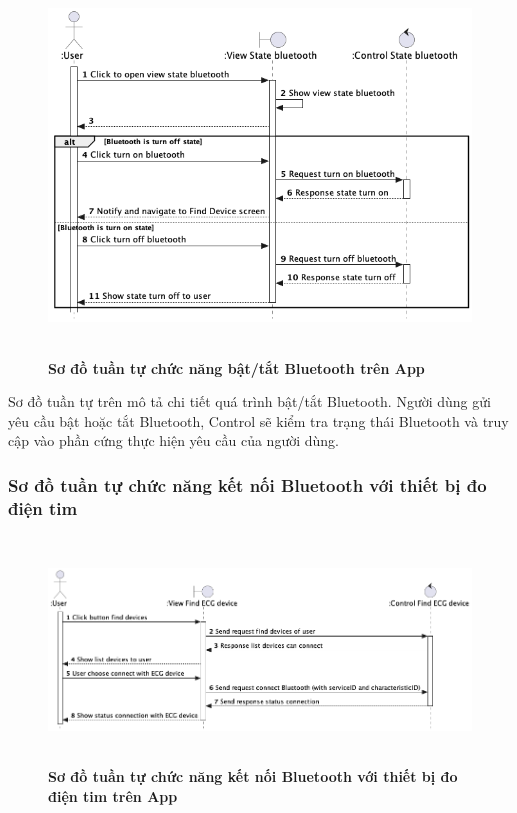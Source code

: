   \begin{figure}[H]
        \centering
        \includegraphics[width=14cm,height=10cm]{Images/mobile_app/turn_on_off_bluetooth.png}
        \caption[Sơ đồ tuần tự chức năng bật/tắt Bluetooth trên App]{\bfseries \fontsize{12pt}{0pt}
        \selectfont Sơ đồ tuần tự chức năng bật/tắt Bluetooth trên App}
        \label{turn_on_off_bluetooth} %
  \end{figure}

  Sơ đồ tuần tự trên mô tả chi tiết quá trình bật/tắt Bluetooth. Người dùng gửi yêu cầu bật hoặc tắt Bluetooth, Control sẽ kiểm tra
  trạng thái Bluetooth và truy cập vào phần cứng thực hiện yêu cầu của người dùng.

\subsubsection{Sơ đồ tuần tự chức năng kết nối Bluetooth với thiết bị đo điện tim}

  \begin{figure}[H]
        \centering
        \includegraphics[width=14cm,height=6cm]{Images/mobile_app/connect_with_device.png}
        \caption[Sơ đồ tuần tự chức năng kết nối Bluetooth với thiết bị đo điện tim trên App]{\bfseries \fontsize{12pt}{0pt}
        \selectfont Sơ đồ tuần tự chức năng kết nối Bluetooth với thiết bị đo điện tim trên App}
        \label{connect_with_device} %
  \end{figure}

